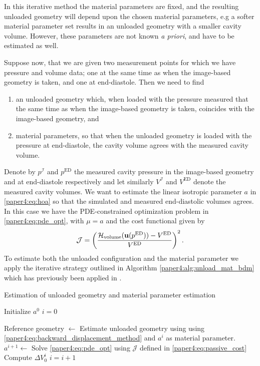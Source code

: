 In this iterative method the material parameters are
fixed, and the resulting unloaded geometry will depend upon the chosen
material parameters, e.g a softer material parameter set results in an unloaded
geometry with a smaller cavity volume.
However, these parameters are not known \emph{a priori}, and have to
be estimated as well.

Suppose now, that we are given two measurement points for which we have
pressure and volume data; one at the same time as when the
image-based geometry is taken, and one at end-diastole. Then we need to find
\begin{enumerate}
  \item an unloaded geometry which, when loaded with the pressure
    measured that the same time as when the image-based geometry is
    taken, coincides with the image-based geometry, and
  \item material parameters, so that when the unloaded geometry is
    loaded with the pressure at end-diastole, the cavity volume
    agrees with the measured cavity volume.
  \end{enumerate}

Denote by $p^{\mathcal{I}}$ and $p^{\mathrm{ED}}$ the measured cavity
pressure in the image-based geometry and at end-diastole respectively
and let similarly $V^{\mathcal{I}}$ and $V^{\mathrm{ED}}$ denote the
measured cavity volumes. We want to estimate the linear isotropic
parameter $a$ in \eqref{paper4:eq:hoa} so that the simulated and measured
end-diastolic volumes agrees. In this
case we have the PDE-constrained optimization problem in
\eqref{paper4:eq:pde_opt}, with $\mu = a$ and the cost functional given by
\begin{align}
  \mathcal{J} = \left(\frac{\mathcal{H}_{\mathrm{volume}}(\mathbf{u}(p^{\mathrm{ED}}))
  - V^{\mathrm{ED}}}{V^{\mathrm{ED}}} \right)^2.
  \label{paper4:eq:passive_cost}
\end{align}
To estimate both the unloaded configuration and the material
parameter we apply the iterative strategy outlined in Algorithm
\ref{paper4:alg:unload_mat_bdm} which has previously been applied in
\cite{nikou2016effects,finsberg2017estimating}.
  
\begin{algorithm}
  \caption{Estimation of unloaded geometry and material parameter
    estimation\label{paper4:alg:unload_mat_bdm}}   
\begin{algorithmic}[1]

  \State Initialize $a^0$ 
  \State $i = 0$

  \State Reference geometry $\gets$ Estimate unloaded geometry using using
  \eqref{paper4:eq:backward_displacement_method} and $a^i$ as material parameter.
  \State $a^{i+1} \gets$ Solve \eqref{paper4:eq:pde_opt} using $\mathcal{J}$
  defined in \eqref{paper4:eq:passive_cost} 
  \State Compute $\Delta V_0^i$
  \State $i = i + 1$
  \EndWhile

\end{algorithmic}
\end{algorithm}

